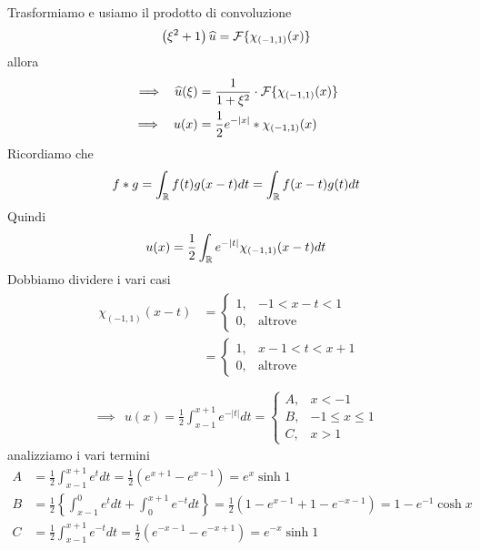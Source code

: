 Trasformiamo e usiamo il prodotto di convoluzione
\begin{equation*}
\left(\xi^{2} + 1\right)\widehat{u} = \mathcal{F} \{\chi_{(- 1, 1)}(x)\}
\end{equation*}
allora
\begin{align*}
\implies \ \ \widehat{u}(\xi) & = \frac{1}{1 + \xi^{2}} \cdot \mathcal{F} \{\chi_{(- 1, 1)}(x)\}\\
\implies \ \ u(x) & = \frac{1}{2} e^{- | x|} *\chi_{(- 1, 1)}(x)
\end{align*}
Ricordiamo che
\begin{equation*}
f*g = \int_{\mathbb{R}} f(t) g(x - t) dt = \int_{\mathbb{R}} f(x - t) g(t) dt
\end{equation*}
Quindi
\begin{equation*}
u(x) = \frac{1}{2}\int_{\mathbb{R}} e^{- | t|} \chi_{(- 1, 1)}(x - t) dt
\end{equation*}
Dobbiamo dividere i vari casi
\begin{gather*}
\begin{aligned}
\chi_{(- 1, 1)}(x - t) & =
\begin{cases}
1, & - 1 < x - t < 1\\
0, & \text{altrove}
\end{cases}\\
 & =
\begin{cases}
1, & x - 1 < t < x + 1\\
0, & \text{altrove}
\end{cases}
\end{aligned}\\
\\
\implies \ \ u(x) = \frac{1}{2}\int^{x + 1}_{x - 1} e^{- | t|} dt =
\begin{cases}
A, & x < - 1\\
B, & - 1 \leq x \leq 1\\
C, & x > 1
\end{cases}
\end{gather*}
analizziamo i vari termini
\begin{align*}
A & = \frac{1}{2}\int^{x + 1}_{x - 1} e^{t} dt = \frac{1}{2}\left(e^{x + 1} - e^{x - 1}\right) = e^{x}\sinh 1\\
B & = \frac{1}{2}\left\{\int^{0}_{x - 1} e^{t} dt + \int^{x + 1}_{0} e^{- t} dt\right\} = \frac{1}{2}\left(1 - e^{x - 1} + 1 - e^{- x - 1}\right) = 1 - e^{- 1}\cosh x\\
C & = \frac{1}{2}\int^{x + 1}_{x - 1} e^{- t} dt = \frac{1}{2}\left(e^{- x - 1} - e^{- x + 1}\right) = e^{- x}\sinh 1
\end{align*}
